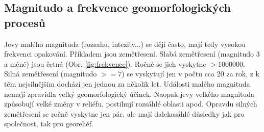\subsection{Magnitudo a frekvence geomorfologických procesů}
Jevy malého magnituda (rozsahu, intezity...) se dějí často, mají tedy vysokou frekvenci opakování. Příkladem jsou zemětřesení. Slabá zemětřesení (magnitudo 3 a méně) jsou četná (Obr. \ref{fig:frekvence}). Ročně se jich vyskytne $> 1000000$. Silná zemětřesení (magnitudo $>=7$) se vyskytují jen v počtu cca 20 za rok, z k těm nejsilnějším dochází jen jednou za několik let. 
Události malého magnituda nemají zpravidla velký geomorfologický účinek. Naopak jevy velkého magnituda způsobují velké změny v reliéfu, postihují rozsáhlé oblasti apod. Opravdu silných zemětřesení se ročně vyskytne jen pár, ale mají dalekosáhlé důsledky jak pro společnost, tak pro georeliéf.



